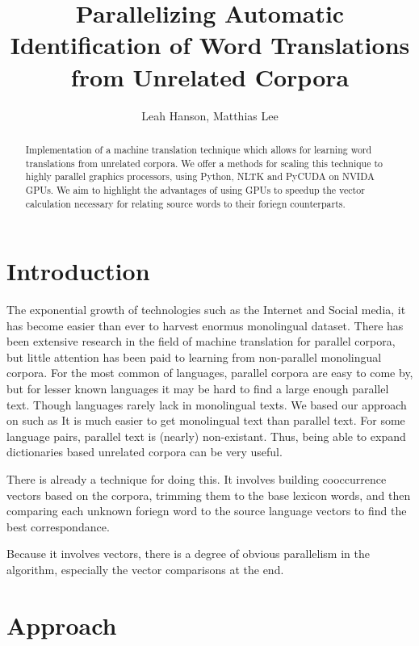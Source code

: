 \documentclass[12pt]{article}
\title{Parallelizing Automatic Identification of Word Translations from Unrelated Corpora}
\author{Leah Hanson, Matthias Lee}
\begin{document}
\maketitle
\begin{abstract}

Implementation of a machine translation technique which allows for learning word translations from unrelated corpora. We offer a methods for scaling this technique to highly parallel graphics processors, using Python, NLTK and PyCUDA on NVIDA GPUs. We aim to highlight the advantages of using GPUs to speedup the vector calculation necessary for relating source words to their foriegn counterparts.

\end{abstract}
\section{Introduction}

The exponential growth of technologies such as the Internet and Social media, it has become easier than ever to harvest enormus monolingual dataset. There has been extensive research in the field of machine translation for parallel corpora, but little attention has been paid to learning from non-parallel monolingual corpora. For the most common of languages, parallel corpora are easy to come by, but for lesser known languages it may be hard to find a large enough parallel text. Though languages rarely lack in monolingual texts. We based our approach on \cite{rapp1999automatic} such as It is much easier to get monolingual text than parallel text. For some
language pairs, parallel text is (nearly) non-existant. Thus, being able to
expand dictionaries based unrelated corpora can be very useful.

There is already a technique for doing this. It involves building cooccurrence
vectors based on the corpora, trimming them to the base lexicon words, and
then comparing each unknown foriegn word to the source language vectors to
find the best correspondance.

Because it involves vectors, there is a degree of obvious parallelism in the
algorithm, especially the vector comparisons at the end.

\section{Approach}
\end{document}
